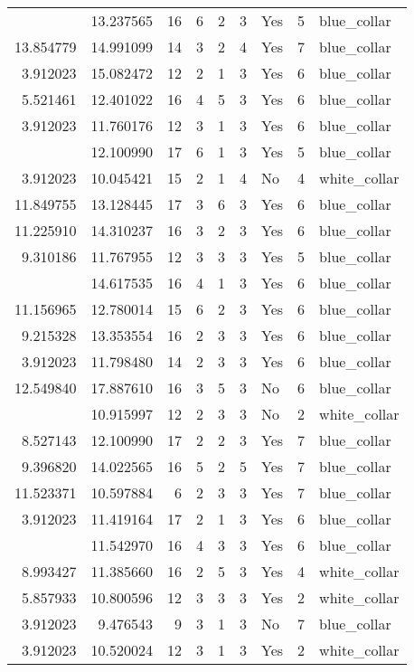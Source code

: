 \documentclass[
]{article}
\begin{document}
\begin{longtable}[t]{rrrrrllrl}
\addlinespace
13.577317 & 13.237565 & 16 & 6 & 2 & 3 & Yes & 5 & blue\_collar\\
13.854779 & 14.991099 & 14 & 3 & 2 & 4 & Yes & 7 & blue\_collar\\
3.912023 & 15.082472 & 12 & 2 & 1 & 3 & Yes & 6 & blue\_collar\\
5.521461 & 12.401022 & 16 & 4 & 5 & 3 & Yes & 6 & blue\_collar\\
3.912023 & 11.760176 & 12 & 3 & 1 & 3 & Yes & 6 & blue\_collar\\
\addlinespace
3.912023 & 12.100990 & 17 & 6 & 1 & 3 & Yes & 5 & blue\_collar\\
3.912023 & 10.045421 & 15 & 2 & 1 & 4 & No & 4 & white\_collar\\
11.849755 & 13.128445 & 17 & 3 & 6 & 3 & Yes & 6 & blue\_collar\\
11.225910 & 14.310237 & 16 & 3 & 2 & 3 & Yes & 6 & blue\_collar\\
9.310186 & 11.767955 & 12 & 3 & 3 & 3 & Yes & 5 & blue\_collar\\
\addlinespace
3.912023 & 14.617535 & 16 & 4 & 1 & 3 & Yes & 6 & blue\_collar\\
11.156965 & 12.780014 & 15 & 6 & 2 & 3 & Yes & 6 & blue\_collar\\
9.215328 & 13.353554 & 16 & 2 & 3 & 3 & Yes & 6 & blue\_collar\\
3.912023 & 11.798480 & 14 & 2 & 3 & 3 & Yes & 6 & blue\_collar\\
12.549840 & 17.887610 & 16 & 3 & 5 & 3 & No & 6 & blue\_collar\\
\addlinespace
8.022897 & 10.915997 & 12 & 2 & 3 & 3 & No & 2 & white\_collar\\
8.527143 & 12.100990 & 17 & 2 & 2 & 3 & Yes & 7 & blue\_collar\\
9.396820 & 14.022565 & 16 & 5 & 2 & 5 & Yes & 7 & blue\_collar\\
11.523371 & 10.597884 & 6 & 2 & 3 & 3 & Yes & 7 & blue\_collar\\
3.912023 & 11.419164 & 17 & 2 & 1 & 3 & Yes & 6 & blue\_collar\\
\addlinespace
10.464531 & 11.542970 & 16 & 4 & 3 & 3 & Yes & 6 & blue\_collar\\
8.993427 & 11.385660 & 16 & 2 & 5 & 3 & Yes & 4 & white\_collar\\
5.857933 & 10.800596 & 12 & 3 & 3 & 3 & Yes & 2 & white\_collar\\
3.912023 & 9.476543 & 9 & 3 & 1 & 3 & No & 7 & blue\_collar\\
3.912023 & 10.520024 & 12 & 3 & 1 & 3 & Yes & 2 & white\_collar\\

\end{longtable}
\end{document}
